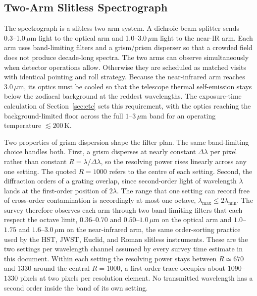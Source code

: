 \documentclass[10pt,onecolumn]{article}
\begin{document}
\subsection{Two-Arm Slitless Spectrograph}

The spectrograph is a slitless two-arm system. A dichroic beam splitter sends 0.3--1.0\,$\mu$m light to the optical arm and 1.0--3.0\,$\mu$m light to the near-IR arm. Each arm uses band-limiting filters and a grism/prism disperser so that a crowded field does not produce decade-long spectra. The two arms can observe simultaneously when detector operations allow. Otherwise they are scheduled as matched visits with identical pointing and roll strategy. Because the near-infrared arm reaches $3.0\,\mu$m, its optics must be cooled so that the telescope thermal self-emission stays below the zodiacal background at the reddest wavelengths. The exposure-time calculation of Section~\ref{sec:etc} sets this requirement, with the optics reaching the background-limited floor across the full $1$--$3\,\mu$m band for an operating temperature $\lesssim200$\,K.

Two properties of grism dispersion shape the filter plan. The same band-limiting choice handles both. First, a grism disperses at nearly constant $\Delta\lambda$ per pixel rather than constant $R=\lambda/\Delta\lambda$, so the resolving power rises linearly across any one setting. The quoted $R=1000$ refers to the centre of each setting. Second, the diffraction orders of a grating overlap, since second-order light of wavelength $\lambda$ lands at the first-order position of $2\lambda$. The range that one setting can record free of cross-order contamination is accordingly at most one octave, $\lambda_{\max}\leq2\lambda_{\min}$. The survey therefore observes each arm through two band-limiting filters that each respect the octave limit, $0.36$--$0.70$ and $0.50$--$1.0\,\mu$m on the optical arm and $1.0$--$1.75$ and $1.6$--$3.0\,\mu$m on the near-infrared arm, the same order-sorting practice used by the HST, JWST, Euclid, and Roman slitless instruments. These are the two settings per wavelength channel assumed by every survey time estimate in this document. Within each setting the resolving power stays between $R\simeq670$ and $1330$ around the central $R=1000$, a first-order trace occupies about $1090$--$1330$ pixels at two pixels per resolution element. No transmitted wavelength has a second order inside the band of its own setting.
\end{document}
